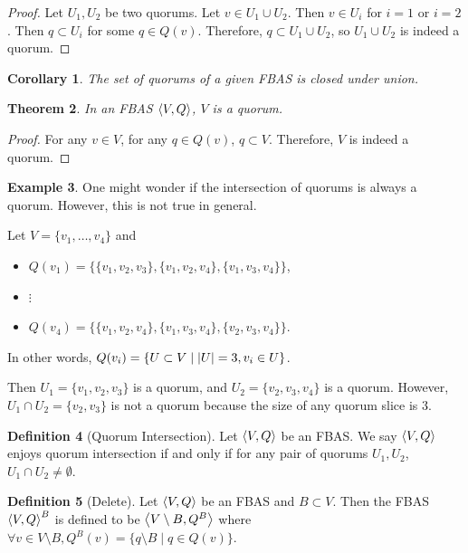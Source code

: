 \documentclass[12pt, psamsfonts]{amsart}
\newtheorem{thm}{Theorem}[subsection]
\newtheorem{cor}[thm]{Corollary}
\theoremstyle{definition}
\newtheorem{defn}[thm]{Definition}
\newtheorem{exmp}[thm]{Example}
\theoremstyle{remark}
\numberwithin{equation}{subsection}
\begin{document}
\begin{proof}
    Let $U_1, U_2$ be two quorums.
    Let $v \in U_1 \cup U_2$.
    Then $v \in U_i$ for $i = 1$ or $i = 2$.
    Then $q \subset U_i$ for some $q \in Q(v)$.
    Therefore, $q \subset U_1 \cup U_2$, so $U_1 \cup U_2$ is indeed a quorum.
\end{proof}

\begin{cor}
    The set of quorums of a given FBAS is closed under union.
\end{cor}

\begin{thm}
    In an FBAS $\ev{V, Q}$, $V$ is a quorum.
\end{thm}

\begin{proof}
    For any $v \in V$, for any $q \in Q(v)$, $q \subset V$.
    Therefore, $V$ is indeed a quorum.
\end{proof}

\begin{exmp}
    One might wonder if the intersection of quorums is always a quorum.
    However, this is not true in general.

    Let $V = \{ v_1, \ldots, v_4 \}$ and
    \begin{itemize}
        \item
            $Q(v_1) = \{ \{ v_1, v_2, v_3 \}, \{ v_1, v_2, v_4 \}, \{ v_1, v_3, v_4 \} \}$,
        \item
            $\vdots$
        \item
            $Q(v_4) = \{ \{ v_1, v_2, v_4 \}, \{ v_1, v_3, v_4 \}, \{ v_2, v_3, v_4 \} \}$.
    \end{itemize}

    In other words, $Q(v_i) = \{ U \subset V \mid \abs{U} = 3, v_i \in U \}$.

    Then $U_1 = \{ v_1, v_2, v_3 \}$ is a quorum, and $U_2 = \{ v_2, v_3, v_4 \}$ is a quorum.
    However, $U_1 \cap U_2 = \{ v_2, v_3 \}$ is not a quorum because the size of any quorum slice is 3.
\end{exmp}

\begin{defn}[Quorum Intersection]
    Let $\ev{V, Q}$ be an FBAS\@.
    We say $\ev{V, Q}$ enjoys quorum intersection if and only if for any pair of quorums $U_1, U_2$, $U_1 \cap U_2 \ne \emptyset$.
\end{defn}

\begin{defn}[Delete]\label{delete_fbas}
    Let $\ev{V, Q}$ be an FBAS and $B \subset V$.
    Then the FBAS $\ev{V, Q}^B$ is defined to be $\ev{V \setminus B, Q^B}$ where $\forall v \in V \setminus B, Q^B(v) = \{ q \setminus B \mid q \in Q(v) \}$.
\end{defn}
\end{document}
